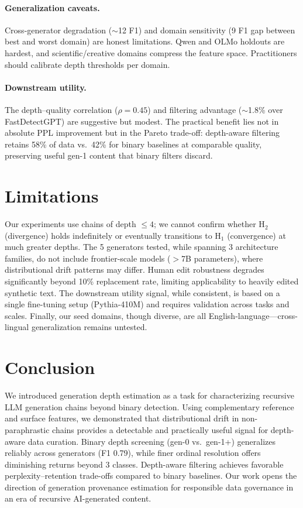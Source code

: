 \documentclass[letterpaper,11pt]{article}
\begin{document}
\paragraph{Generalization caveats.} Cross-generator degradation ($\sim$12 F1) and domain sensitivity (9 F1 gap between best and worst domain) are honest limitations. Qwen and OLMo holdouts are hardest, and scientific/creative domains compress the feature space. Practitioners should calibrate depth thresholds per domain.

\paragraph{Downstream utility.} The depth--quality correlation ($\rho = 0.45$) and filtering advantage ($\sim$1.8\% over FastDetectGPT) are suggestive but modest. The practical benefit lies not in absolute PPL improvement but in the Pareto trade-off: depth-aware filtering retains 58\% of data vs.\ 42\% for binary baselines at comparable quality, preserving useful gen-1 content that binary filters discard.

\section{Limitations}
\label{sec:limitations}

Our experiments use chains of depth $\leq 4$; we cannot confirm whether H$_2$ (divergence) holds indefinitely or eventually transitions to H$_1$ (convergence) at much greater depths. The 5 generators tested, while spanning 3 architecture families, do not include frontier-scale models ($>$7B parameters), where distributional drift patterns may differ. Human edit robustness degrades significantly beyond 10\% replacement rate, limiting applicability to heavily edited synthetic text. The downstream utility signal, while consistent, is based on a single fine-tuning setup (Pythia-410M) and requires validation across tasks and scales. Finally, our seed domains, though diverse, are all English-language---cross-lingual generalization remains untested.

\section{Conclusion}
\label{sec:conclusion}

We introduced generation depth estimation as a task for characterizing recursive LLM generation chains beyond binary detection. Using complementary reference and surface features, we demonstrated that distributional drift in non-paraphrastic chains provides a detectable and practically useful signal for depth-aware data curation. Binary depth screening (gen-0 vs.\ gen-1+) generalizes reliably across generators (F1 0.79), while finer ordinal resolution offers diminishing returns beyond 3 classes. Depth-aware filtering achieves favorable perplexity--retention trade-offs compared to binary baselines. Our work opens the direction of generation provenance estimation for responsible data governance in an era of recursive AI-generated content.
\end{document}
